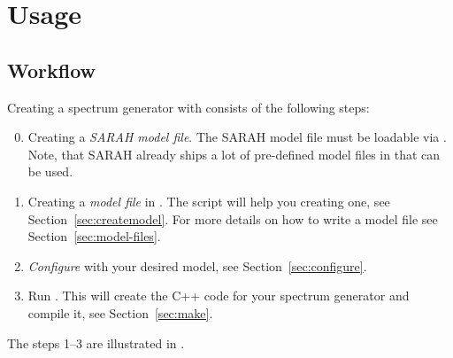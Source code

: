 \section{Usage}

\subsection{Workflow}

Creating a spectrum generator with \flexisusy consists of the
following steps:
%
\begin{enumerate}
  \setcounter{enumi}{-1}
\item Creating a \emph{SARAH model file}.  The SARAH model file must
  be loadable via .  Note, that SARAH
  already ships a lot of pre-defined model files in
   that can be used.
\item Creating a \emph{\flexisusy model file} in
  .  The  script will
  help you creating one, see Section~\ref{sec:createmodel}.  For more
  details on how to write a \flexisusy model file see
  Section~\ref{sec:model-files}.
\item \emph{Configure} \flexisusy with your desired model, see
  Section~\ref{sec:configure}.
\item Run .  This will create the C++ code for your
  spectrum generator and compile it, see Section~\ref{sec:make}.
\end{enumerate}
%
The steps 1--3 are illustrated in .

